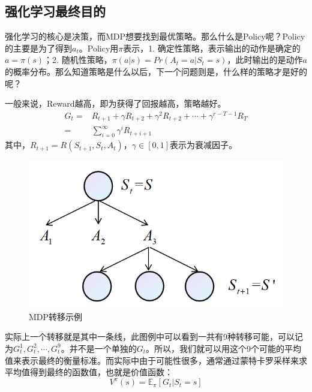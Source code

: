 \documentclass[a4paper]{article}
\begin{document}
\subsection{强化学习最终目的}
强化学习的核心是决策，而MDP想要找到最优策略。那么什么是Policy呢？Policy的主要是为了得到$a_t$。Policy用$\pi$表示，1. 确定性策略，表示输出的动作是确定的$a=\pi(s)$；2. 随机性策略，$\pi(a|s) = Pr(A_t=a|S_t=s)$，此时输出的是动作$a$的概率分布。那么知道策略是什么以后，下一个问题则是，什么样的策略才是好的呢？

一般来说，Reward越高，即为获得了回报越高，策略越好。
\begin{equation}
    \begin{aligned}
    G_t = & R_{t+1} + \gamma R_{t+2} + \gamma^2 R_{t+2} + \cdots + \gamma^{r-T-1} R_T \\
    = & \sum_{i=0}^\infty \gamma^i R_{t+i+1}
    \end{aligned}
\end{equation}
其中，$R_{t+1}=R\left(S_{t+1}, S_{t}, A_{t}\right)$，$\gamma \in [0,1]$表示为衰减因子。
\begin{figure}[H]
    \centering
    \includegraphics[width=.50\textwidth]{微信图片_20200720005916.png}
    \caption{MDP转移示例}
    \label{fig:my_label_1}
\end{figure}
实际上一个转移就是其中一条线，此图例中可以看到一共有9种转移可能，可以记为$G_t^{1},G_t^{2},\cdots,G_t^{9}$。并不是一个单独的$G_t$。所以，我们就可以用这个9个可能的平均值来表示最终的衡量标准。而实际中由于可能性很多，通常通过蒙特卡罗采样来求平均值得到最终的函数值，也就是价值函数：
\begin{equation}
    V^\pi(s) = \mathbb{E}_{\pi}[G_t|S_t=s]
\end{equation}
\end{document}
